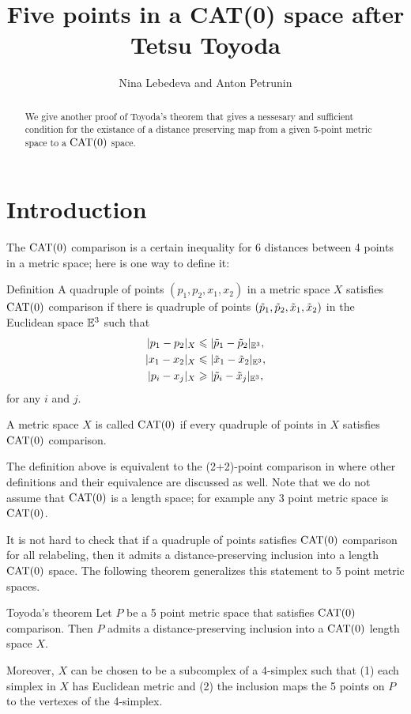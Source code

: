 \documentclass{article}
\begin{document}
\title{Five points in a CAT(0) space after  Tetsu Toyoda}
\author{Nina Lebedeva and Anton Petrunin}
\date{}
\maketitle
\begin{abstract}
We give another proof of Toyoda's theorem that gives a nessesary and sufficient condition for the existance of a distance preserving map from a given 5-point metric space to a $\CAT(0)$ space. 
\end{abstract}

\section{Introduction}

The $\CAT(0)$ comparison is a certain inequality for 6 distances between 4 points in a metric space; here is one way to define it:

\begin{thm}{Definition}
A quadruple of points $(p_1,p_2,x_1,x_2)$ in a metric space $X$ satisfies $\CAT(0)$ comparison
if there is quadruple of points $(\~p_1,\~p_2,\~x_1,\~x_2)$ in the Euclidean space $\EE^3$ such that 
\begin{align*}
|p_1-p_2|_{X}&\le|\~p_1-\~p_2|_{\EE^3},
\\ 
|x_1-x_2|_{X}&\le|\~x_1-\~x_2|_{\EE^3},
\\ 
|p_i-x_j|_{X}&\ge|\~p_i-\~x_j|_{\EE^3},
\end{align*}
for any $i$ and $j$.

A metric space $X$ is called $\CAT(0)$ if every quadruple of points in $X$ satisfies $\CAT(0)$ comparison.
\end{thm}

The definition above is equivalent to the (2+2)-point comparison in \cite{alexander-kapovitch-petrunin}
where other definitions and their equivalence are discussed as well.
Note that we do not assume that $\CAT(0)$ is a length space;
for example any 3 point metric space is $\CAT(0)$.


It is not hard to check that if a quadruple of points satisfies $\CAT(0)$ comparison for all relabeling,
then it admits a distance-preserving inclusion into a length $\CAT(0)$ space.
The following theorem generalizes this statement to 5 point metric spaces.

\begin{thm}{Toyoda's theorem}
Let $P$ be a 5 point metric space that satisfies $\CAT(0)$ comparison.
Then $P$ admits a distance-preserving inclusion into a $\CAT(0)$ length space $X$.

Moreover,
$X$ can be chosen to be a subcomplex of a 4-simplex such that (1) each simplex in $X$ has Euclidean metric and (2) the inclusion maps the 5 points on $P$ to the vertexes of the 4-simplex.
\end{thm}
\end{document}

